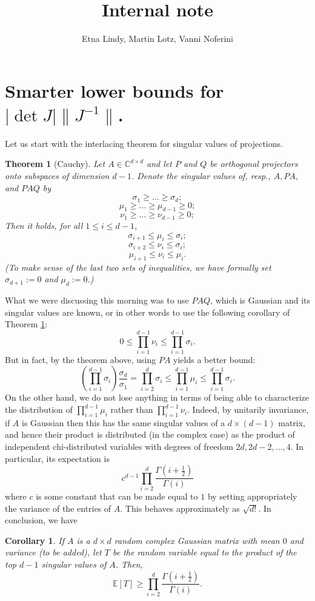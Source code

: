 \documentclass[12pt]{article}
\title{Internal note}
\author{Etna Lindy, Martin Lotz, Vanni Noferini}
\def\E{\mathbb{E}}
\def\C{\mathbb{C}}
\newtheorem{theorem}{Theorem}[section]
\newtheorem{corollary}{Corollary}[section]
\begin{document}
\maketitle
\section{Smarter lower bounds for $|\det J| \|J^{-1}\|$.}
Let us start with the interlacing theorem for singular values of projections.
\begin{theorem}[Cauchy]\label{cauchy}
    Let $A \in \C^{d \times d}$ and let $P$ and $Q$ be orthogonal projectors onto subspaces of dimension $d-1$. Denote the singular values of, resp., $A,PA,$ and $PAQ$ by
    \[ \sigma_1 \geq \dots \geq \sigma_d;\]
    \[ \mu_1 \geq \dots \geq \mu_{d-1} \geq 0;   \]
     \[ \nu_1 \geq \dots \geq \nu_{d-1} \geq 0;   \]
     Then it holds, for all $1\leq i \leq d-1$,
     \[ \sigma_{i+1} \leq \mu_i \leq \sigma_i;   \]
      \[ \sigma_{i+2} \leq \nu_i \leq \sigma_i;   \]
      \[ \mu_{i+1} \leq \nu_i \leq \mu_i. \]
      (To make sense of the last two sets of inequalities, we have formally set $\sigma_{d+1}:=0$ and $\mu_{d}:=0$.)
\end{theorem}

What we were discussing this morning was to use $PAQ$, which is Gaussian and its singular values are known, or in other words to use the following corollary of Theorem \ref{cauchy}:
\[ 0 \leq \prod_{i=1}^{d-1} \nu_i \leq \prod_{i=1}^{d-1} \sigma_i.  \]
But in fact, by the theorem above, using $PA$ yields a better bound:
\[ \left( \prod_{i=1}^{d-1} \sigma_i \right) \frac{\sigma_d}{\sigma_1}  = \prod_{i=2}^{d} \sigma_i \leq \prod_{i=1}^{d-1} \mu_i \leq \prod_{i=1}^{d-1} \sigma_i.   \]
On the other hand, we do not lose anything in terms of being able to characterize the distribution of $\prod_{i=1}^{d-1} \mu_i$ rather than $\prod_{i=1}^{d-1} \nu_i$. Indeed, by unitarily invariance, if $A$ is Gaussian then this has the same singular values of a $d \times (d-1)$ matrix, and hence their product is distributed (in the complex case) as the product of independent chi-distributed variables with degrees of freedom $2d,2d-2,\dots,4$. In particular, its expectation is
\[ c^{d-1} \prod_{i=2}^{d} \frac{\Gamma(i+\frac12)}{\Gamma(i)} \]
where $c$ is some constant that can be made equal to $1$ by setting appropriately the variance of the entries of $A$. This behaves approximately as $\sqrt{d!}$.
In conclusion, we have
\begin{corollary}
If $A$ is a $d \times d$ random complex Gaussian matrix with mean $0$ and variance (to be added), let $T$ be the random variable equal to the product of the top $d-1$ singular values of $A$. Then,
\[ \E[T] \geq \prod_{i=2}^{d} \frac{\Gamma(i+\frac12)}{\Gamma(i)}.  \]
\end{corollary}
\end{document}
